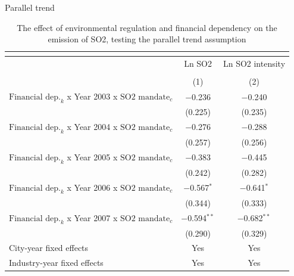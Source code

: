 \documentclass{beamer}
\begin{document}
\begin{frame}{Parallel trend}

    \begin{table}[htbp]\centering
        \begin{adjustbox}{width=\textwidth,
        totalheight=\baselineskip,keepaspectratio}
        \begin{threeparttable}   
            \caption{\small The effect of environmental regulation and financial dependency on the emission of SO2, testing the parallel trend assumption}
            \begin{tabular}{l*{2}{c}}
                \toprule
                & \multicolumn{2}{c}{} \\ 
                \hline
             & \multicolumn{1}{c}{Ln SO2} & \multicolumn{1}{c}{Ln SO2 intensity} \\ 
                \\[-1.8ex] & (1) & (2) \\ 
                \hline
                $\text{Financial dep.}_k$ x Year 2003 x $\text{SO2 mandate}_c$ & $-$0.236 & $-$0.240 \\ 
                & (0.225) & (0.235) \\ 
                $\text{Financial dep.}_k$ x Year 2004 x $\text{SO2 mandate}_c$ & $-$0.276 & $-$0.288 \\ 
                & (0.257) & (0.256) \\ 
                $\text{Financial dep.}_k$ x Year 2005 x $\text{SO2 mandate}_c$ & $-$0.383 & $-$0.445 \\ 
                & (0.242) & (0.282) \\ 
                $\text{Financial dep.}_k$ x Year 2006 x $\text{SO2 mandate}_c$ & $-$0.567$^{*}$ & $-$0.641$^{*}$ \\ 
                & (0.344) & (0.333) \\ 
                $\text{Financial dep.}_k$ x Year 2007 x $\text{SO2 mandate}_c$ & $-$0.594$^{**}$ & $-$0.682$^{**}$ \\ 
                & (0.290) & (0.329) \\  
                \midrule
                City-year fixed effects & Yes & Yes  \\ 
                Industry-year fixed effects & Yes & Yes  \\ 

\end{tabular}
\end{threeparttable}
\end{adjustbox}
\end{table}
\end{frame}
\end{document}
